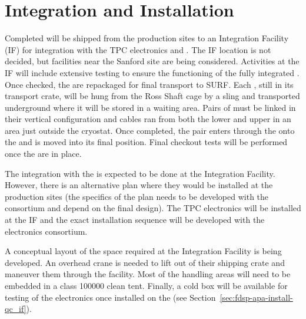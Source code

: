 \section{Integration and Installation}
\label{sec:fdsp-apa-install}

Completed  will be shipped from the  production sites to an Integration Facility (IF) for integration with the TPC  electronics and .  The IF location is not decided, but facilities near the Sanford site are being considered.   Activities at the IF will include extensive  testing to ensure the functioning of the fully integrated .  Once checked, the  are repackaged for final transport to SURF. Each , still in its transport crate, will be hung from the Ross Shaft cage by a sling and transported underground where it will be stored in a waiting area.  Pairs of  must be linked in their vertical configuration and cables ran from both the lower and upper  in an area just outside the cryostat.  Once completed, the pair enters through the  onto the  and is moved into its final position.  Final checkout tests will be performed once the  are in place.

The integration with the  is expected to be done at the Integration Facility. However, there is an alternative plan where they would be installed at the  production sites (the specifics of the plan needs to be developed with the  consortium and depend on the final  design). The TPC  electronics will be installed  at the IF and the exact installation sequence will be developed with the electronics consortium.

A conceptual layout of the space required at the Integration Facility is being developed. An overhead crane is needed to lift  out of their shipping crate and maneuver them through the facility.  Most of the handling areas will need to be embedded in a class \num{100000} clean tent. Finally, a cold box will be available for  testing of the electronics once installed on the  (see Section~\ref{sec:fdsp-apa-install-qc_if}).  



